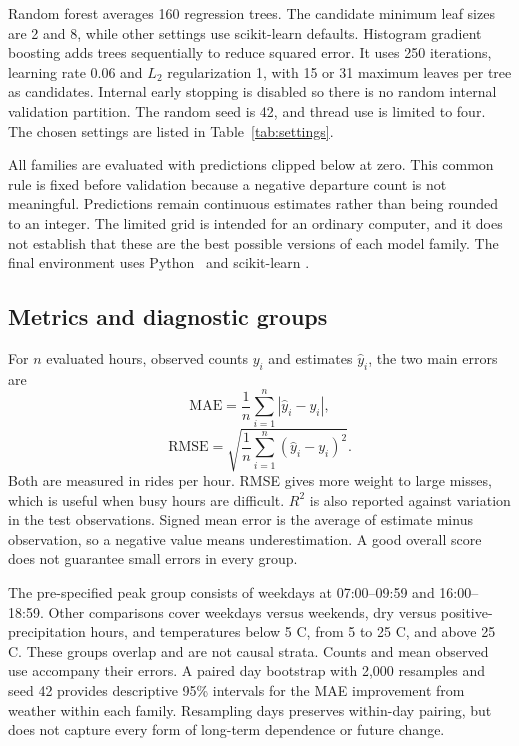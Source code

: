\documentclass[10pt]{article}
\begin{document}
Random forest averages 160 regression trees. The candidate minimum leaf sizes are 2 and 8, while other settings use scikit-learn defaults. Histogram gradient boosting adds trees sequentially to reduce squared error. It uses 250 iterations, learning rate 0.06 and $L_2$ regularization 1, with 15 or 31 maximum leaves per tree as candidates. Internal early stopping is disabled so there is no random internal validation partition. The random seed is 42, and thread use is limited to four. The chosen settings are listed in Table~\ref{tab:settings}.

\begin{table}[t]
\caption{Settings selected using 2024 only. RF has 160 trees. Boosting uses 250 iterations, learning rate 0.06 and regularization 1.}
\label{tab:settings}
\centering

\end{table}

All families are evaluated with predictions clipped below at zero. This common rule is fixed before validation because a negative departure count is not meaningful. Predictions remain continuous estimates rather than being rounded to an integer. The limited grid is intended for an ordinary computer, and it does not establish that these are the best possible versions of each model family. The final environment uses Python \PythonVersion\ and scikit-learn \SklearnVersion.

\subsection{Metrics and diagnostic groups}
For $n$ evaluated hours, observed counts $y_i$ and estimates $\hat{y}_i$, the two main errors are
\begin{equation}
\mathrm{MAE}=\frac{1}{n}\sum_{i=1}^{n}|\hat{y}_i-y_i|,
\end{equation}
\begin{equation}
\mathrm{RMSE}=\sqrt{\frac{1}{n}\sum_{i=1}^{n}(\hat{y}_i-y_i)^2}.
\end{equation}
Both are measured in rides per hour. RMSE gives more weight to large misses, which is useful when busy hours are difficult. $R^2$ is also reported against variation in the test observations. Signed mean error is the average of estimate minus observation, so a negative value means underestimation. A good overall score does not guarantee small errors in every group.

The pre-specified peak group consists of weekdays at 07:00--09:59 and 16:00--18:59. Other comparisons cover weekdays versus weekends, dry versus positive-precipitation hours, and temperatures below 5 C, from 5 to 25 C, and above 25 C. These groups overlap and are not causal strata. Counts and mean observed use accompany their errors. A paired day bootstrap with 2,000 resamples and seed 42 provides descriptive 95\% intervals for the MAE improvement from weather within each family. Resampling days preserves within-day pairing, but does not capture every form of long-term dependence or future change.
\end{document}
